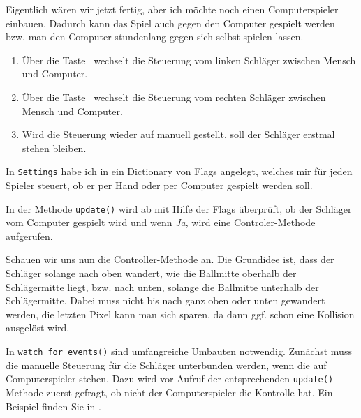 Eigentlich wären wir jetzt fertig, aber ich möchte noch einen Computerspieler einbauen. Dadurch kann das Spiel auch gegen den Computer gespielt werden bzw. man den Computer stundenlang gegen sich selbst spielen lassen.

\begin{enumerate}
	\item Über die Taste~ wechselt die Steuerung vom linken Schläger zwischen Mensch und Computer.\label{req0201Computer1}

	\item Über die Taste~ wechselt die Steuerung vom rechten Schläger zwischen Mensch und Computer.\label{req0201Computer2}
	
	\item Wird die Steuerung wieder auf manuell gestellt, soll der Schläger erstmal stehen bleiben.\label{req0201ComputerHalt}
\end{enumerate}
\er

In \texttt{Settings} habe ich in  ein Dictionary von Flags angelegt, welches mir für jeden Spieler steuert, ob er per Hand oder per Computer gespielt werden soll. 


In der Methode \texttt{update()} wird ab  mit Hilfe der Flags überprüft, ob der Schläger vom Computer gespielt wird und wenn \emph{Ja}, wird eine Controler-Methode aufgerufen.


Schauen wir uns nun die Controller-Methode an. Die Grundidee ist, dass der Schläger solange nach oben wandert, wie die Ballmitte oberhalb der Schlägermitte liegt, bzw. nach unten, solange die Ballmitte unterhalb der Schlägermitte. Dabei muss nicht bis nach ganz oben oder unten gewandert werden, die letzten Pixel kann man sich sparen, da dann ggf. schon eine Kollision ausgelöst wird.


In \texttt{watch\_for\_events()} sind umfangreiche Umbauten notwendig. Zunächst muss die manuelle Steuerung für die Schläger unterbunden werden, wenn die auf Computerspieler stehen. Dazu wird vor Aufruf der entsprechenden \texttt{update()}-Methode zuerst gefragt, ob nicht der Computerspieler die Kontrolle hat. Ein Beispiel finden Sie in .

